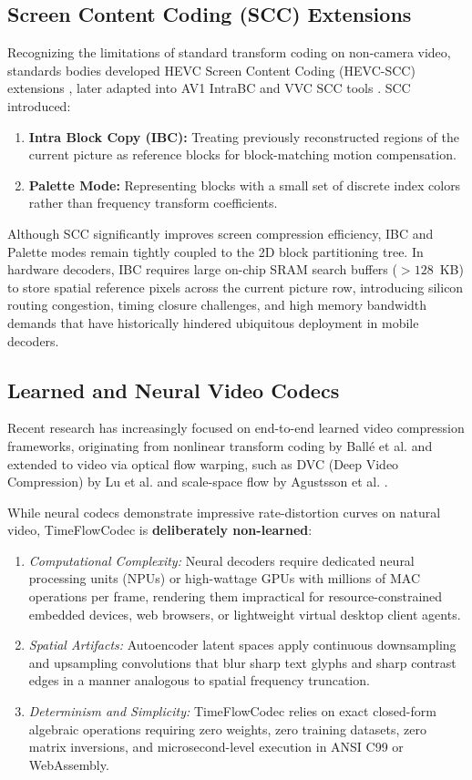 \documentclass[conference]{IEEEtran}
\begin{document}
\subsection{Screen Content Coding (SCC) Extensions}
Recognizing the limitations of standard transform coding on non-camera video, standards bodies developed HEVC Screen Content Coding (HEVC-SCC) extensions \cite{xu2015overview}, later adapted into AV1 IntraBC \cite{chen2020overview} and VVC SCC tools \cite{bross2021overview}. SCC introduced:
\begin{enumerate}
    \item \textbf{Intra Block Copy (IBC):} Treating previously reconstructed regions of the current picture as reference blocks for block-matching motion compensation.
    \item \textbf{Palette Mode:} Representing blocks with a small set of discrete index colors rather than frequency transform coefficients.
\end{enumerate}

Although SCC significantly improves screen compression efficiency, IBC and Palette modes remain tightly coupled to the 2D block partitioning tree. In hardware decoders, IBC requires large on-chip SRAM search buffers ($>128$~KB) to store spatial reference pixels across the current picture row, introducing silicon routing congestion, timing closure challenges, and high memory bandwidth demands that have historically hindered ubiquitous deployment in mobile decoders.

\subsection{Learned and Neural Video Codecs}
Recent research has increasingly focused on end-to-end learned video compression frameworks, originating from nonlinear transform coding by Ball{\'e} et al. \cite{balle2018variational} and extended to video via optical flow warping, such as DVC (Deep Video Compression) by Lu et al. \cite{lu2019dvc} and scale-space flow by Agustsson et al. \cite{agustsson2020scale}.

While neural codecs demonstrate impressive rate-distortion curves on natural video, TimeFlowCodec is \textbf{deliberately non-learned}:
\begin{enumerate}
    \item \textit{Computational Complexity:} Neural decoders require dedicated neural processing units (NPUs) or high-wattage GPUs with millions of MAC operations per frame, rendering them impractical for resource-constrained embedded devices, web browsers, or lightweight virtual desktop client agents.
    \item \textit{Spatial Artifacts:} Autoencoder latent spaces apply continuous downsampling and upsampling convolutions that blur sharp text glyphs and sharp contrast edges in a manner analogous to spatial frequency truncation.
    \item \textit{Determinism and Simplicity:} TimeFlowCodec relies on exact closed-form algebraic operations requiring zero weights, zero training datasets, zero matrix inversions, and microsecond-level execution in ANSI C99 or WebAssembly.
\end{enumerate}
\end{document}
